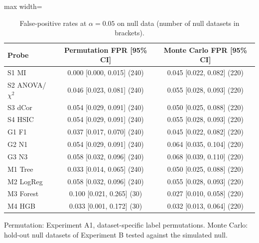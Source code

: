 \begin{table}[!t]
\centering
\caption{False-positive rates at $\alpha=0.05$ on null data (number of null datasets in brackets).}
\label{tab:calibration}
\footnotesize
\begin{adjustbox}{max width=\linewidth}
\begin{tabular}{lcc}
\hline
Probe & Permutation FPR [95\% CI] & Monte Carlo FPR [95\% CI] \\ \hline
S1 MI & 0.000 [0.000, 0.015] (240) & 0.045 [0.022, 0.082] (220) \\
S2 ANOVA/$\chi^2$ & 0.046 [0.023, 0.081] (240) & 0.055 [0.028, 0.093] (220) \\
S3 dCor & 0.054 [0.029, 0.091] (240) & 0.050 [0.025, 0.088] (220) \\
S4 HSIC & 0.054 [0.029, 0.091] (240) & 0.055 [0.028, 0.093] (220) \\
G1 F1 & 0.037 [0.017, 0.070] (240) & 0.045 [0.022, 0.082] (220) \\
G2 N1 & 0.054 [0.029, 0.091] (240) & 0.064 [0.035, 0.104] (220) \\
G3 N3 & 0.058 [0.032, 0.096] (240) & 0.068 [0.039, 0.110] (220) \\
M1 Tree & 0.033 [0.014, 0.065] (240) & 0.050 [0.025, 0.088] (220) \\
M2 LogReg & 0.058 [0.032, 0.096] (240) & 0.055 [0.028, 0.093] (220) \\
M3 Forest & 0.100 [0.021, 0.265] (30) & 0.027 [0.010, 0.058] (220) \\
M4 HGB & 0.033 [0.001, 0.172] (30) & 0.032 [0.013, 0.064] (220) \\
\hline
\end{tabular}
\end{adjustbox}
\par\vspace{2pt}\parbox{0.95\linewidth}{\scriptsize Permutation: Experiment A1, dataset-specific label permutations. Monte Carlo: hold-out null datasets of Experiment B tested against the simulated null.}
\end{table}
